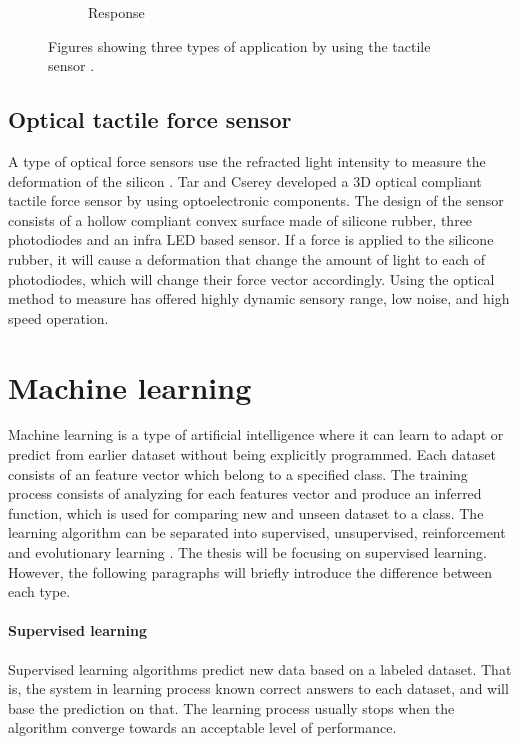 \documentclass[USenglish]{ifimaster}  %
\begin{document}
\begin{figure}
\begin{subfigure}[b]{0.32\textwidth}
		\caption{Response}
		\label{fig:tact3}
	\end{subfigure}\hfill
	\caption{Figures showing three types of application by using the tactile sensor \cite{Cutkosky2008}.}
	\label{fig:tactiles}
\end{figure}

\FloatBarrier



\subsection{Optical tactile force sensor}
A type of optical force sensors use the refracted light intensity to measure the deformation of the silicon \cite{6027100}\cite{6907805}. Tar and Cserey \cite{6027100} developed a 3D optical compliant tactile force sensor by using optoelectronic components. The design of the sensor consists of a hollow compliant convex surface made of silicone rubber, three photodiodes and an infra LED based sensor.  If a force is applied to the silicone rubber, it will cause a deformation that change the amount of light to each of photodiodes, which will change their force vector accordingly. Using the optical method to measure has offered highly dynamic sensory range, low noise, and high speed operation.

\section {Machine learning}
Machine learning is a type of artificial intelligence where it can learn to adapt or predict from earlier dataset without being explicitly programmed. Each dataset consists of an feature vector which belong to a specified class. The training process consists of analyzing for each features vector and produce an inferred function, which is used for comparing new and unseen dataset to a class. The learning algorithm can be separated into supervised, unsupervised, reinforcement and evolutionary learning \cite{Marsland:2009:MLA:1571643}. The thesis will be focusing on supervised learning. However, the following paragraphs will briefly introduce the difference between each type.
	
\paragraph{Supervised learning}
Supervised learning algorithms predict new data based on a labeled dataset. That is, the system in learning process known correct answers to each dataset, and will base the prediction on that. The learning process usually stops when the algorithm converge towards an acceptable level of performance.
	
\end{document}
